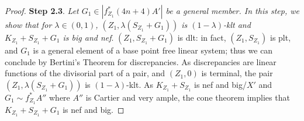 \documentclass[11pt]{ip-journal}
\theoremstyle{definition}
\begin{document}
\begin{proof}
\medskip

{\bf Step 2.3}.
{\it Let $G_1 \in |f_{Z_1}^\ast(4n+4) A'|$ be a general member. In this step, we show that for $\lambda \in (0, 1)$, $(Z_1, \lambda (S_{Z_1}+G_1))$ is $(1-\lambda)$-klt and $K_{Z_1}+S_{Z_1}+G_1$ is big and nef}.
\newline
$(Z_1, S_{Z_1}+G_1)$ is dlt: in fact, $(Z_1, S_{Z_1})$ is plt, and $G_1$ is a general element of a base point free linear system; thus we can conclude by Bertini's Theorem for discrepancies. 
As discrepancies are linear functions of the divisorial part of a pair, and $(Z_1, 0)$ is terminal, the pair $(Z_1, \lambda (S_{Z_1}+G_1))$ is $(1-\lambda)$-klt. 
As $K_{Z_1}+S_{Z_1}$ is nef and big/$X'$ and $G_1 \sim f_{Z_1}^\ast A''$ where $A''$ is Cartier and very ample, the cone theorem implies that $K_{Z_1}+S_{Z_1}+G_1$ is nef and big. 

\medskip


\end{proof}
\end{document}

